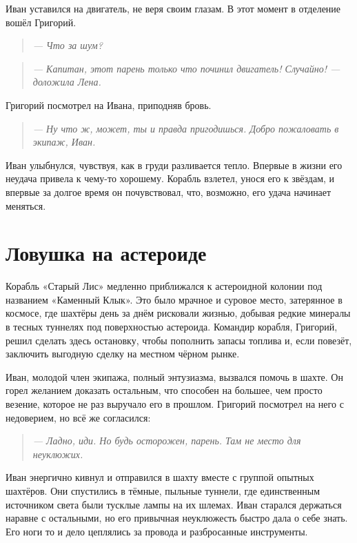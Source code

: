 \documentclass[12pt,a4paper]{book}
\newenvironment{dialogue}{\begin{quote}\itshape}{\end{quote}}
\begin{document}
Иван уставился на двигатель, не веря своим глазам. В этот момент в отделение вошёл Григорий.

\begin{dialogue}
--- Что за шум?
\end{dialogue}

\begin{dialogue}
--- Капитан, этот парень только что починил двигатель! Случайно! --- доложила Лена.
\end{dialogue}

Григорий посмотрел на Ивана, приподняв бровь.

\begin{dialogue}
--- Ну что ж, может, ты и правда пригодишься. Добро пожаловать в экипаж, Иван.
\end{dialogue}

Иван улыбнулся, чувствуя, как в груди разливается тепло. Впервые в жизни его неудача привела к чему-то хорошему. Корабль взлетел, унося его к звёздам, и впервые за долгое время он почувствовал, что, возможно, его удача начинает меняться.

\chapter{Ловушка на астероиде}

Корабль «Старый Лис» медленно приближался к астероидной колонии под названием «Каменный Клык». Это было мрачное и суровое место, затерянное в космосе, где шахтёры день за днём рисковали жизнью, добывая редкие минералы в тесных туннелях под поверхностью астероида. Командир корабля, Григорий, решил сделать здесь остановку, чтобы пополнить запасы топлива и, если повезёт, заключить выгодную сделку на местном чёрном рынке.

Иван, молодой член экипажа, полный энтузиазма, вызвался помочь в шахте. Он горел желанием доказать остальным, что способен на большее, чем просто везение, которое не раз выручало его в прошлом. Григорий посмотрел на него с недоверием, но всё же согласился:

\begin{dialogue}
--- Ладно, иди. Но будь осторожен, парень. Там не место для неуклюжих.
\end{dialogue}

Иван энергично кивнул и отправился в шахту вместе с группой опытных шахтёров. Они спустились в тёмные, пыльные туннели, где единственным источником света были тусклые лампы на их шлемах. Иван старался держаться наравне с остальными, но его привычная неуклюжесть быстро дала о себе знать. Его ноги то и дело цеплялись за провода и разбросанные инструменты.
\end{document}
